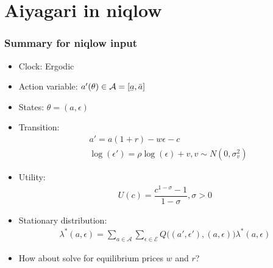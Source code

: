 \documentclass{beamer}
\newcommand{\ubar}[1]{\underaccent{\bar}{#1}}
\begin{document}
\section{Aiyagari in niqlow}
\begin{frame}
\frametitle{Summary for niqlow input}
\begin{itemize}
	\item Clock: Ergodic
	\item Action variable: $a'(\theta) \in \mathcal{A} = [\ubar{a},\bar{a}]$
	\item States: $\theta = (a,\epsilon)$
	\item Transition: 
	\begin{equation}
	\begin{aligned}
	& a' = a(1+r) - w \epsilon - c \\ 
	& \log(\epsilon') = \rho \log(\epsilon) + v, v \sim N(0,\sigma_v^2)
	\end{aligned}
	\end{equation}
	\item Utility: 
	\begin{equation}
	\begin{aligned}
	U(c) = \dfrac{c^{1-\sigma}-1 }{1-\sigma}, \sigma > 0
	\end{aligned}
	\end{equation}
	\item Stationary distribution: 
	\begin{equation}
	\begin{aligned}
	\lambda^*(a,\epsilon) 
	= \sum_{a \in \mathcal{A} } 
	\sum_{\epsilon \in \mathcal{E}} 
	Q\big( (a',\epsilon'),(a,\epsilon) \big)
	\lambda^*(a,\epsilon)
	\end{aligned}
	\end{equation}
\item How about solve for equilibrium prices $w$ and $r$? 
\end{itemize}

\end{frame}
\end{document}
